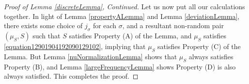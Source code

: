\documentclass[12pt,reqno]{article}
\numberwithin{equation}{section}
\begin{document}
\begin{proof}[Proof of Lemma \ref{discreteLemma}, Continued]
    Let us now put all our calculations together. In light of Lemma \ref{propertyALemma} and Lemma \ref{deviationLemma}, there exists some choice of $j_\sigma$ for each $\sigma$, and a resultant non-random pair $(\mu_S, S)$ such that $S$ satisfies Property (A) of the Lemma, and $\mu_S$ satisfies \eqref{equation12901904192090129102}, implying that $\mu_S$ satisfies Property (C) of the Lemma. But Lemma \ref{nuNormalizationLemma} shows that $\mu_S$ always satisfies Property (B), and Lemma \eqref{largeFrequencyLemma} shows Property (D) is also always satisfied. This completes the proof.
    \begin{comment}

    Now
    \begin{align*}
        r_{m+1}^{d/2} \log(M_{m+1}) &= \left( l_{m+1}^{a\varepsilon - \frac{dn-s}{2n}} \cdot r_{m+1}^{d/2} \log(M_{m+1}) \right) l_{m+1}^{\frac{dn - s}{2n} - a \varepsilon}.
    \end{align*}
    Equation \eqref{equation5890129048128941891} implies
    \begin{align*}
        &l_{m+1}^{a\varepsilon - \frac{dn-s}{2n}} \cdot r_{m+1}^{d/2} \log(M_{m+1})\\
        &\ \ \ \ \ = \frac{l_m^{a\varepsilon - \frac{dn-s}{2n} + d/2} \log(M_{m+1}) K_{m+1}^{\frac{dn-s}{2n} - a\varepsilon}}{M_{m+1}^{a\varepsilon + \frac{s}{2n}}}\\
        &\ \ \ \ \ \leq \left[ l_m^{a\varepsilon - \frac{dn-s}{2n} + d/2} 2^{\frac{dn-s}{2n} - a \varepsilon} \right] \log(M_{m+1}) M_{m+1}^{\left( \frac{s}{dn-s} + c\varepsilon \right)\left(\frac{dn-s}{2n} - a\varepsilon\right) - a\varepsilon - \frac{s}{2n}}.
    \end{align*}
    Now
    \begin{align*}
        \left( \frac{s}{dn - s} + c\varepsilon \right) \left( \frac{dn - s}{2n} - a\varepsilon \right) - a\varepsilon &\leq \left[ \frac{(dn-s)c}{2n} - \left( \frac{s}{dn-s}+1 \right)a \right] \varepsilon\\
        &= \left[ \frac{d(3 - na)}{(dn - s)} \right] \varepsilon\\
        &\leq -2 \varepsilon.
    \end{align*}
    Since $\log(M_{m+1}) \leq (2/\varepsilon) M_{m+1}^{\varepsilon/2}$, if we assume that
    \begin{equation} \label{equation1290412904129049102}

\end{comment}
\end{proof}
\end{document}
